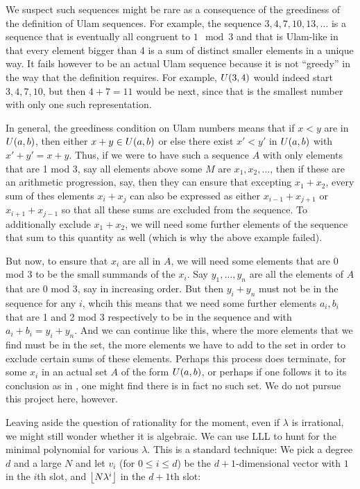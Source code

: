 \documentclass{report}
\theoremstyle{remark}
\numberwithin{equation}{section}
\begin{document}
We suspect such sequences might be rare as a consequence of the
greediness of the definition of Ulam sequences.  For example, the
sequence $3, 4, 7, 10, 13, \ldots$ is a sequence that is eventually
all congruent to $1\mod 3$ and that is Ulam-like in that every element
bigger than 4 is a sum of distinct smaller elements in a unique way.
It fails however to be an actual Ulam sequence because it is not
``greedy'' in the way that the definition requires.  For example,
$U(3,4)$ would indeed start $3, 4, 7, 10$, but then $4+7 = 11$
would be next, since that is the smallest number with only one such
representation.  

In general, the greediness condition on Ulam numbers means that if
$x < y$ are in $U(a,b)$, then either $x+y \in U(a,b)$ or
else there exist $x' < y'$ in $U(a,b)$ with $x'+y' = x+y$.  Thus,
if we were to have such a sequence $A$ with only elements that are 1
mod 3, say all elements above some $M$ are $x_1, x_2, \ldots$, then if
these are an arithmetic progression, say, then they can ensure that
excepting $x_1 + x_2$, every sum of thes elements $x_i + x_j$ can also
be expressed as either $x_{i-1} + x_{j+1}$ or $x_{i+1}+x_{j-1}$ so
that all these sums are excluded from the sequence.  To additionally
exclude $x_1 + x_2$, we will need some further elements of the
sequence that sum to this quantity as well (which is why the above
example failed).

But now, to ensure that $x_i$ are all in $A$, we will need some
elements that are 0 mod 3 to be the small summands of the $x_i$.  Say
$y_1, \ldots, y_n$ are all the elements of $A$ that are 0 mod 3, say
in increasing order.  But then $y_i + y_n$ must not be in the sequence
for any $i$, whcih this means that we need some further elements
$a_i, b_i$ that are 1 and 2 mod 3 respectively to be in the sequence
and with $a_i+b_i = y_i + y_n$.  And we can continue like this, where
the more elements that we find must be in the set, the more elements
we have to add to the set in order to exclude certain sums of these
elements.  Perhaps this process does terminate, for some $x_i$ in an
actual set $A$ of the form $U(a,b)$, or perhaps if one follows it
to its conclusion as in \cite{schmerl:jct1994}, one might find
there is in fact no such set.  We do not pursue this project here,
however.  

Leaving aside the question of rationality for the moment, even if
$\lambda$ is irrational, we might still wonder whether it is
algebraic.  We can use LLL to hunt for the minimal polynomial for
various $\lambda$.  This is a standard technique: We pick a degree $d$
and a large $N$ and let $v_i$ (for $0 \leq i \leq d$) be the
$d+1$-dimensional vector with $1$ in the $i$th slot, and
$\left\lfloor N\lambda^i \right\rfloor$ in the $d+1$th slot:
\end{document}
